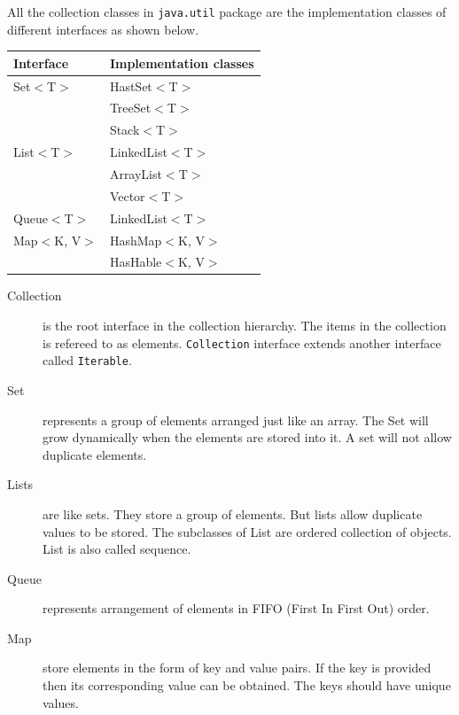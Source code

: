 \documentclass[11pt,a4paper]{article}
\begin{document}
All the collection classes in \texttt{java.util} package are the implementation classes of different interfaces as shown below.

\begin{table}[H]
\begin{tabular}{|l|p{7cm}|}
\hline
\textbf{Interface} & \textbf{Implementation classes} \\ \hline
Set$<$T$>$ & HastSet$<$T$>$\\
           & TreeSet$<$T$>$ \\ \hline
           & Stack$<$T$>$ \\ 
List$<$T$>$& LinkedList$<$T$>$ \\
          &  ArrayList$<$T$>$\\ 
          & Vector$<$T$>$ \\ \hline
Queue$<$T$>$ & LinkedList$<$T$>$\\ \hline
Map$<$K, V$>$ & HashMap$<$K, V$>$ \\
             & HasHable$<$K, V$>$ \\ \hline	

\end{tabular}
\end{table}

\begin{description}
\item [Collection] is the root interface in the collection hierarchy. The items in the collection is refereed to as elements. \texttt{Collection} interface extends another interface called \texttt{Iterable}.

\item [Set] represents a group of elements arranged just like an array. The Set will grow dynamically when the elements are stored into it. A set will not allow duplicate elements. 

\item [Lists] are like sets. They store a group of elements. But lists allow duplicate values to be stored.
The subclasses of List are ordered collection of objects. List is also called sequence.

\item [Queue] represents arrangement of elements in FIFO (First In First Out) order.

\item [Map] store elements in the form of key and value pairs. If the key is provided then its corresponding value can be obtained. The keys should have unique values.
\end{description}
\end{document}
